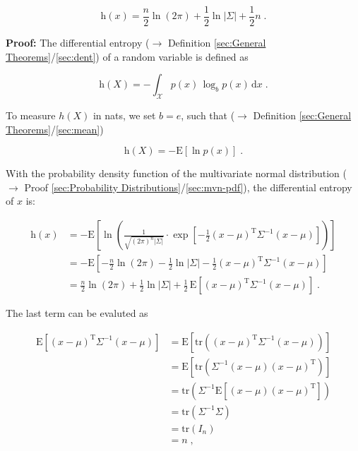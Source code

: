 \documentclass[a4paper,12pt,twoside]{book}
\begin{document}
\begin{equation} \label{eq:mvn-dent-mvn-dent}
\mathrm{h}(x) = \frac{n}{2} \ln(2\pi) + \frac{1}{2} \ln|\Sigma| + \frac{1}{2} n \; .
\end{equation}


\vspace{1em}
\textbf{Proof:} The differential entropy ($\rightarrow$ Definition \ref{sec:General Theorems}/\ref{sec:dent}) of a random variable is defined as

\begin{equation} \label{eq:mvn-dent-dent}
\mathrm{h}(X) = - \int_{\mathcal{X}} p(x) \, \log_b p(x) \, \mathrm{d}x \; .
\end{equation}

To measure $h(X)$ in nats, we set $b = e$, such that ($\rightarrow$ Definition \ref{sec:General Theorems}/\ref{sec:mean})

\begin{equation} \label{eq:mvn-dent-dent-nats}
\mathrm{h}(X) = - \mathrm{E}\left[ \ln p(x) \right] \; .
\end{equation}

With the probability density function of the multivariate normal distribution ($\rightarrow$ Proof \ref{sec:Probability Distributions}/\ref{sec:mvn-pdf}), the differential entropy of $x$ is:

\begin{equation} \label{eq:mvn-dent-mvn-dent-s1}
\begin{split}
\mathrm{h}(x) &= - \mathrm{E}\left[ \ln \left( \frac{1}{\sqrt{(2 \pi)^n |\Sigma|}} \cdot \exp \left[ -\frac{1}{2} (x-\mu)^\mathrm{T} \Sigma^{-1} (x-\mu) \right] \right) \right] \\
&= - \mathrm{E}\left[ - \frac{n}{2} \ln(2\pi) - \frac{1}{2} \ln|\Sigma| - \frac{1}{2} (x-\mu)^\mathrm{T} \Sigma^{-1} (x-\mu) \right] \\
&= \frac{n}{2} \ln(2\pi) + \frac{1}{2} \ln|\Sigma| + \frac{1}{2} \, \mathrm{E}\left[ (x-\mu)^\mathrm{T} \Sigma^{-1} (x-\mu) \right] \; .
\end{split}
\end{equation}

The last term can be evaluted as

\begin{equation} \label{eq:mvn-dent-mvn-dent-t3}
\begin{split}
\mathrm{E}\left[ (x-\mu)^\mathrm{T} \Sigma^{-1} (x-\mu) \right] &= \mathrm{E}\left[ \mathrm{tr}\left( (x-\mu)^\mathrm{T} \Sigma^{-1} (x-\mu) \right) \right] \\
&= \mathrm{E}\left[ \mathrm{tr}\left( \Sigma^{-1} (x-\mu) (x-\mu)^\mathrm{T} \right) \right] \\
&= \mathrm{tr}\left( \Sigma^{-1} \mathrm{E}\left[ (x-\mu) (x-\mu)^\mathrm{T} \right] \right) \\
&= \mathrm{tr}\left( \Sigma^{-1} \Sigma \right) \\
&= \mathrm{tr}\left( I_n \right) \\
&= n \; , \\
\end{split}
\end{equation}
\end{document}
